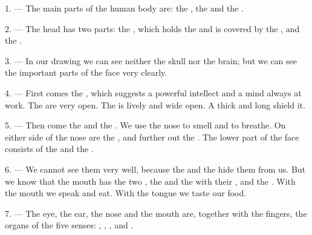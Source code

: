 
\VUsaut{4.0mm}
\VUsaut{2.0mm}

\VUsaut{2.4mm}
\VUsaut{3.0mm}

1. --- The main parts of the human body are: the , the
 and the .

\VUsaut{3.0mm}

2. --- The head has two parts: the , which holds the
 and is covered by the , and the .

3. --- In our drawing we can see neither the skull nor the brain; but we can see the important
parts of the face very clearly.

4. --- First comes the , which suggests a powerful intellect and a mind
always at work. The  are very open. The  is lively and wide open.
A thick  and long
 shield it.

5. --- Then come the  and the . We use the nose to smell and to
breathe. On either side of the nose are the , and further out the
. The lower part of the face consists of the  and the
.

6. --- We cannot see them very well, because the  and the
 hide them from us. But we know that the mouth has the two
, the  and the  with their
, and the . With the mouth we speak and eat.
With the tongue we taste our food.

7. --- The eye, the ear, the nose and the mouth are, together with the fingers, the organs of
the five senses: , ,
,  and .


